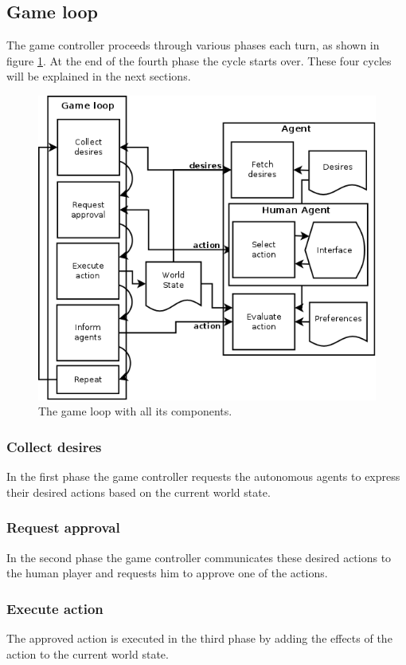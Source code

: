 \documentclass[11pt,a4paper]{article}
\begin{document}
  \subsection{Game loop}
      The game controller proceeds through various phases each turn, as shown in figure \ref{fig:gl}. At the end of the fourth phase the cycle starts over. These four cycles will be explained in the next sections. 
      
  \begin{figure}[h!]
  \centering
	\includegraphics[scale=0.25]{gameloop.png}
	\caption{The game loop with all its components.}
	\label{fig:gl}  
  \end{figure}
 
    \subsubsection{Collect desires}
      In the first phase the game controller requests the autonomous agents to express their desired actions based on the current world state.
    \subsubsection{Request approval}
      In the second phase the game controller communicates these desired actions to the human player and requests him to approve one of the actions.
    \subsubsection{Execute action}
      The approved action is executed in the third phase by adding the effects of the action to the current world state.
\end{document}
